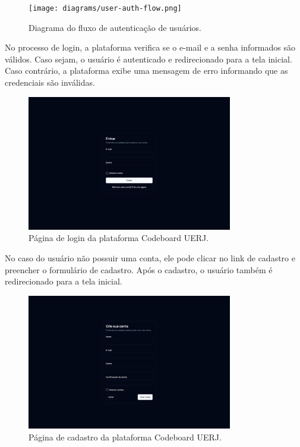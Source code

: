 \begin{figure}[H]
    \centering
    \texttt{[image: diagrams/user-auth-flow.png]}
    \caption{Diagrama do fluxo de autenticação de usuários.}
    \label{fig:user-auth-flow}
\end{figure}

No processo de login, a plataforma verifica se o e-mail e a senha informados são válidos. Caso sejam, o usuário é autenticado e redirecionado para a tela inicial. Caso contrário, a plataforma exibe uma mensagem de erro informando que as credenciais são inválidas.

\begin{figure}[H]
    \centering
    \includegraphics[width=0.8\textwidth]{assets/codeboard/login-page.png}
    \caption{Página de login da plataforma Codeboard UERJ.}
    \label{fig:login-page}
\end{figure}

No caso do usuário não possuir uma conta, ele pode clicar no link de cadastro e preencher o formulário de cadastro. Após o cadastro, o  usuário também é redirecionado para a tela inicial.

\begin{figure}[H]
    \centering
    \includegraphics[width=0.8\textwidth]{assets/codeboard/signup-page.png}
    \caption{Página de cadastro da plataforma Codeboard UERJ.}
    \label{fig:signup-page}
\end{figure}

